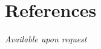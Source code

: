 \documentclass[11pt,a4paper,sans]{moderncv}        %
\begin{document}
\section{References}
\emph{Available upon request}

%

\end{document}
